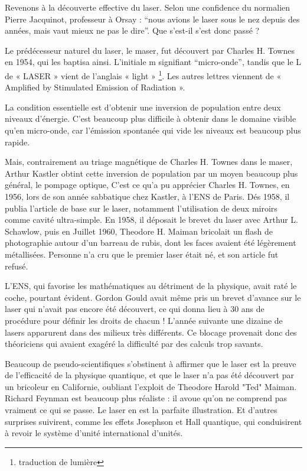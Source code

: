 \documentclass[a4paper,12pt]{article}
\begin{document}
Revenons à la découverte effective du laser. Selon une confidence du normalien  Pierre Jacquinot, professeur à Orsay : ``nous avions le laser sous le nez depuis des années, mais vaut mieux ne pas le dire''. Que s'est-il s'est donc passé ?

Le prédécesseur naturel du laser, le maser, fut découvert par Charles H. Townes en 1954, qui les baptisa ainsi. L'initiale m signifiant ``micro-onde'', tandis que le L de « LASER » vient de l'anglais « light » \footnote{traduction de lumière}. Les autres lettres viennent de « Amplified by Stimulated Emission of Radiation ». 

La condition essentielle est d'obtenir une inversion de population entre deux niveaux d'énergie. C'est beaucoup plus difficile à obtenir dans le domaine visible qu'en micro-onde, car l'émission spontanée qui vide les niveaux est beaucoup plus rapide. 

Mais, contrairement au triage magnétique de Charles H. Townes dans le maser, Arthur Kastler obtint cette inversion de population par un moyen beaucoup plus général, le pompage optique,  C'est ce qu'a pu apprécier Charles H. Townes, en 1956, lors de son année sabbatique  chez Kastler, à l'ENS de Paris. Dés 1958, il publia l'article de base sur le laser, notamment l'utilisation de deux miroirs comme cavité ultra-simple. En 1958, il déposait le brevet du laser avec Arthur L. Schawlow, puis en Juillet 1960, Theodore H. Maiman bricolait un flash de photographie autour d'un barreau de rubis, dont les faces avaient été légèrement métallisées. Personne n'a cru que le premier laser était né, et son article fut refusé. 

L'ENS, qui favorise les mathématiques au détriment de la physique, avait raté le coche, pourtant évident. Gordon Gould avait même pris un brevet d'avance sur le laser qui n'avait pas encore été découvert, ce qui donna lieu à 30 ans de procédure pour définir les droits de chacun ! L'année suivante une dizaine de lasers apparurent dans des milieux très différents. Ce blocage provenait donc des théoriciens qui avaient exagéré la difficulté par des calculs trop savants.

Beaucoup de pseudo-scientifiques s'obstinent à affirmer que le laser est la preuve de l'efficacité de la physique quantique, et que le laser n'a pas été découvert par un bricoleur en Californie, oubliant l'exploit de Theodore Harold "Ted" Maiman. Richard Feynman est beaucoup plus réaliste : il avoue qu'on ne comprend pas vraiment ce qui se passe. Le laser en est la parfaite illustration. Et d'autres surprises suivirent, comme les effets Josephson et Hall quantique, qui conduisirent à revoir le système d'unité international d'unités.
\end{document}
